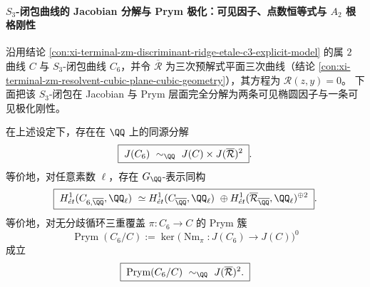 \paragraph{\texorpdfstring{$S_3$}{S3}-闭包曲线的 Jacobian 分解与 Prym 极化：可见因子、点数恒等式与 \texorpdfstring{$A_2$}{A2} 根格刚性}\label{par:xi-terminal-zm-s3-closure-jacobian-prym-a2}
沿用结论 \ref{con:xi-terminal-zm-discriminant-ridge-etale-c3-explicit-model} 的属 \(2\) 曲线 \(C\) 与 \(S_3\)-闭包曲线 \(C_6\)，并令 \(\overline{\mathcal R}\) 为三次预解式平面三次曲线（结论 \ref{con:xi-terminal-zm-resolvent-cubic-plane-cubic-geometry}），其方程为 \(\mathscr R(z,y)=0\)。
下面把该 \(S_3\)-闭包在 Jacobian 与 Prym 层面完全分解为两条可见椭圆因子与一条可见极化刚性。

\begin{theorem}\label{thm:xi-terminal-zm-s3-closure-jacobian-splitting}
在上述设定下，存在在 \(\QQ\) 上的同源分解
\[
\boxed{\;
J(C_6)\ \sim_{\QQ}\ J(C)\times J(\overline{\mathcal R})^{2}\; }.
\]
等价地，对任意素数 \(\ell\)，存在 \(G_{\QQ}\)-表示同构
\[
\boxed{\;
H^1_{\acute et}(C_{6,\overline{\QQ}},\QQ_\ell)\ \simeq
H^1_{\acute et}(C_{\overline{\QQ}},\QQ_\ell)\ \oplus
H^1_{\acute et}(\overline{\mathcal R}_{\overline{\QQ}},\QQ_\ell)^{\oplus2}\; }.
\]
等价地，对无分歧循环三重覆盖 \(\pi:C_6\to C\) 的 Prym 簇
\[
\operatorname{Prym}(C_6/C):=\ker\!\bigl(\operatorname{Nm}_{\pi}:J(C_6)\to J(C)\bigr)^{0}
\]
成立
\[
\boxed{\;\operatorname{Prym}(C_6/C)\ \sim_{\QQ}\ J(\overline{\mathcal R})^{2}.\;}
\]
\end{theorem}
